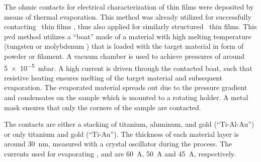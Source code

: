 The ohmic contacts for electrical characterization of  thin films were deposited by means of thermal evaporation.
This method was already utilized for successfully contacting \agao\ thin films
    \cite{vogt2023},
thus also applied for similarly structured \cro\ thin films.
This \gls{pvd} method utilizes a \enquote{boat} made of a material with high melting temperature (tungsten  or molybdenum ) that is loaded with the target material in form of powder or filament.
A vacuum chamber is used to achieve pressures of around \qty{5e-5}{\milli\bar}.
A high current is driven through the contacted boat, such that resistive heating ensures melting of the target material and subsequent evaporation.
The evaporated material spreads out due to the pressure gradient and condensates on the sample which is mounted to a rotating holder.
A metal mask ensures that only the corners of the sample are contacted.

The contacts are either a stacking of titanium, aluminum, and gold (\enquote{Ti-Al-Au}) or only titanium and gold (\enquote{Ti-Au}).
The thickness of each material layer is around \qty{30}{\nm}, measured with a crystal oscillator during the process.
The currents used for evaporating ,  and  are \qty{60}{\ampere}, \qty{50}{\ampere} and \qty{45}{\ampere}, respectively.